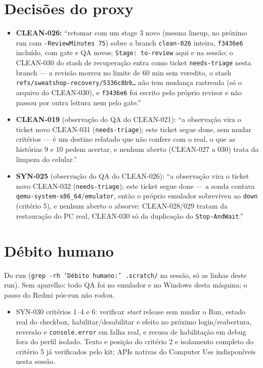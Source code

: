 \documentclass[11pt,a4paper]{article}
\begin{document}
\section{Decisões do proxy}
\begin{itemize}
  \item \textbf{CLEAN-026:} ``retomar com um stage 3 novo (mesma lineup, no
        próximo run com \texttt{-ReviewMinutes 75}) sobre a branch
        \texttt{clean-026} inteira, \texttt{f3436e6} incluído, com gate e QA
        novos; \texttt{Stage: to-review} aqui e na sessão; o CLEAN-030 do stash
        de recuperação entra como ticket \texttt{needs-triage} nesta branch ---
        a revisão morreu no limite de 60 min sem veredito, o stash
        \texttt{refs/sweatshop-recovery/5336c8b9\ldots} não tem mudança
        rastreada (só o arquivo do CLEAN-030), e \texttt{f3436e6} foi escrito
        pelo próprio revisor e não passou por outra leitura nem pelo gate.''
  \item \textbf{CLEAN-019} (observação do QA do CLEAN-021): ``a observação
        vira o ticket novo CLEAN-031 (\texttt{needs-triage}); este ticket segue
        done, sem mudar critérios --- é um destino relatado que não confere com
        o real, o que as histórias 9 e 10 pedem acertar, e nenhum aberto
        (CLEAN-027 a 030) trata da limpeza do celular.''
  \item \textbf{SYN-025} (observação do QA do CLEAN-026): ``a observação vira
        o ticket novo CLEAN-032 (\texttt{needs-triage}); este ticket segue done
        --- a sonda contava \texttt{qemu-system-x86\_64}/\texttt{emulator},
        então o próprio emulador sobreviveu ao \texttt{down} (critério 5), e
        nenhum aberto o absorve: CLEAN-028/029 tratam da restauração do PC
        real, CLEAN-030 só da duplicação do \texttt{Stop-AndWait}.''
\end{itemize}

\section{Débito humano}
Do run (\texttt{grep -rh 'Débito humano:' .scratch/} na sessão, só as linhas
deste run). Sem aparelho: todo QA foi no emulador e no Windows desta máquina;
o passo do Redmi pós-run não rodou.
\begin{itemize}
  \item SYN-030 critérios 1--4 e 6: verificar \emph{start} release sem mudar
        o Run, estado real do checkbox, habilitar/desabilitar e efeito no
        próximo login/reabertura, reversão e \texttt{console.error} em falha
        real, e recusa de habilitação em debug fora do perfil isolado. Texto e
        posição do critério 2 e isolamento completo do critério 5 já
        verificados pelo kit; APIs nativas do Computer Use indisponíveis
        nesta sessão.
\end{itemize}
\end{document}
